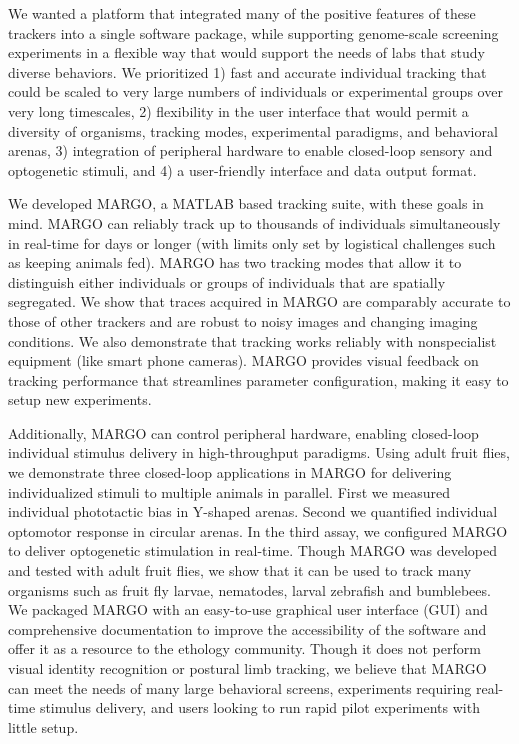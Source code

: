 \documentclass[10pt,letterpaper]{article}
\begin{document}
We wanted a platform that integrated many of the positive features of these trackers into a single software package, while supporting genome-scale screening experiments in a flexible way that would support the needs of labs that study diverse behaviors. We prioritized 1) fast and accurate individual tracking that could be scaled to very large numbers of individuals or experimental groups over very long timescales, 2) flexibility in the user interface that would permit a diversity of organisms, tracking modes, experimental paradigms, and behavioral arenas, 3) integration of peripheral hardware to enable closed-loop sensory and optogenetic stimuli, and 4) a user-friendly interface and data output format. 

We developed MARGO, a MATLAB based tracking suite, with these goals in mind. MARGO can reliably track up to thousands of individuals simultaneously in real-time for days or longer (with limits only set by logistical challenges such as keeping animals fed). MARGO has two tracking modes that allow it to distinguish either individuals or groups of individuals that are spatially segregated. We show that traces acquired in MARGO are comparably accurate to those of other trackers and are robust to noisy images and changing imaging conditions. We also demonstrate that tracking works reliably with nonspecialist equipment (like smart phone cameras). MARGO provides visual feedback on tracking performance that streamlines parameter configuration, making it easy to setup new experiments. 

Additionally, MARGO can control peripheral hardware, enabling closed-loop individual stimulus delivery in high-throughput paradigms. Using adult fruit flies, we demonstrate three closed-loop \cite{heisenberg_wolf_1984} applications in MARGO for delivering individualized stimuli to multiple animals in parallel. First we measured individual phototactic bias in Y-shaped arenas. Second we quantified individual optomotor response in circular arenas. In the third assay, we configured MARGO to deliver optogenetic stimulation in real-time. Though MARGO was developed and tested with adult fruit flies, we show that it can be used to track many organisms such as fruit fly larvae, nematodes, larval zebrafish and bumblebees. We packaged MARGO with an easy-to-use graphical user interface (GUI) and comprehensive documentation to improve the accessibility of the software and offer it as a resource to the ethology community. Though it does not perform visual identity recognition or postural limb tracking, we believe that MARGO can meet the needs of many large behavioral screens, experiments requiring real-time stimulus delivery, and users looking to run rapid pilot experiments with little setup.
\end{document}
